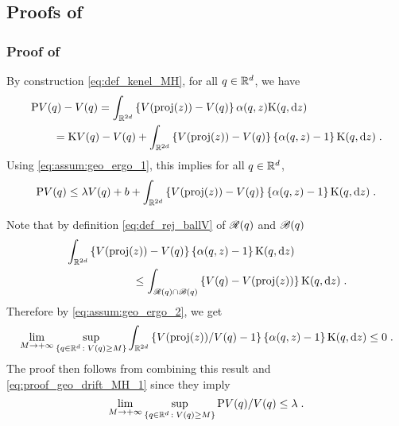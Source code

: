 \subsection{Proofs of }

\subsubsection{Proof of }
\label{sec:proof-crefpr}
By construction   \eqref{eq:def_kenel_MH}, for all $q \in \mathbb{R}^d$, we have
\begin{align}
&\mathrm{P} V (q) - V(q) = \int_{\mathbb{R}^{2d}} \left\lbrace V(\mathrm{proj}(z)) - V(q) \right\rbrace \alpha(q,z) \mathrm{K}(q, \mathrm{d} z )  \\
& \qquad = \mathrm{K}V(q)-V(q) +\int_{\mathbb{R}^{2d}} \left\lbrace V(\mathrm{proj}(z)) - V(q) \right\rbrace \left\lbrace \alpha(q,z)-1 \right\rbrace \mathrm{K}(q, \mathrm{d} z ) \;.
\end{align}
Using \eqref{eq:assum:geo_ergo_1}, this implies for all $q \in \mathbb{R}^d$,
\begin{equation}
\label{eq:proof_geo_drift_MH_1}
\mathrm{P} V (q)  \leq \lambda V(q) + b
+ \int_{\mathbb{R}^{2d}} \left\lbrace V(\mathrm{proj}(z)) - V(q) \right\rbrace \left\lbrace \alpha(q,z)-1 \right\rbrace \mathrm{K}(q, \mathrm{d} z ) \;.
\end{equation}

Note that by definition \eqref{eq:def_rej_ballV} of $\mathscr{R}(q)$ and $\mathscr{B}(q)$
\begin{align}
&\int_{\mathbb{R}^{2d}} \left\lbrace V(\mathrm{proj}(z)) - V(q) \right\rbrace \left\lbrace \alpha(q,z)-1 \right\rbrace \mathrm{K}(q, \mathrm{d} z )
\\ &  \qquad  \qquad  \qquad  \leq    \int_{\mathscr{R}(q) \cap \mathscr{B}(q) } \left\lbrace  V(q)-V(\mathrm{proj}(z)) \right\rbrace  \mathrm{K}(q, \mathrm{d} z ) \;.
\end{align}
Therefore by \eqref{eq:assum:geo_ergo_2}, we get
\begin{equation}
 \lim_{M\to +\infty} \sup_{\left\{q \in \mathbb{R}^d\,:\; V(q) \geq M\right\}}  \int_{\mathbb{R}^{2d}} \left\{V(\mathrm{proj}(z))/V(q) -1 \right\} \left\{ \alpha(q,z)-1 \right\} \mathrm{K}(q, \mathrm{d} z ) \leq 0 \;.
\end{equation}
The proof then follows from combining this result and \eqref{eq:proof_geo_drift_MH_1} since they imply
\begin{equation}
   \lim_{M\to +\infty} \sup_{\left\{q \in \mathbb{R}^d\,:\; V(q) \geq M\right\}}  \mathrm{P} V (q) / V(q) \leq \lambda  \;.
\end{equation}

